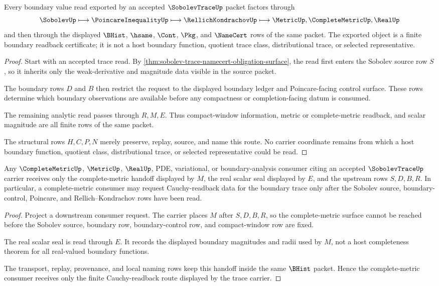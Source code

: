 \begin{theorem}
\label{thm:sobolev-trace-boundary-readback}
Every boundary value read exported by an accepted $\SobolevTraceUp$ packet factors through
$$
\SobolevUp \longmapsto \PoincareInequalityUp \longmapsto \RellichKondrachovUp \longmapsto \MetricUp,\CompleteMetricUp,\RealUp
$$
and then through the displayed $\BHist$, $\hsame$, $\Cont$, $\Pkg$, and $\NameCert$ rows of the same packet. The exported object is a finite boundary readback certificate; it is not a host boundary function, quotient trace class, distributional trace, or selected representative.
\end{theorem}
\begin{proof}
Start with an accepted trace read. By \autoref{thm:sobolev-trace-namecert-obligation-surface}, the read first enters the Sobolev source row $S$, so it inherits only the weak-derivative and magnitude data visible in the source packet.

The boundary rows $D$ and $B$ then restrict the request to the displayed boundary ledger and Poincare-facing control surface. These rows determine which boundary observations are available before any compactness or completion-facing datum is consumed.

The remaining analytic read passes through $R,M,E$. Thus compact-window information, metric or complete-metric readback, and scalar magnitude are all finite rows of the same packet.

The structural rows $H,C,P,N$ merely preserve, replay, source, and name this route. No carrier coordinate remains from which a host boundary function, quotient class, distributional trace, or selected representative could be read.
\end{proof}

\begin{theorem}
\label{thm:sobolev-trace-complete-metric-handoff}
Any $\CompleteMetricUp$, $\MetricUp$, $\RealUp$, PDE, variational, or boundary-analysis consumer citing an accepted $\SobolevTraceUp$ carrier receives only the complete-metric handoff displayed by $M$, the real scalar seal displayed by $E$, and the upstream rows $S,D,B,R$. In particular, a complete-metric consumer may request Cauchy-readback data for the boundary trace only after the Sobolev source, boundary-control, Poincare, and Rellich--Kondrachov rows have been read.
\end{theorem}
\begin{proof}
Project a downstream consumer request. The carrier places $M$ after $S,D,B,R$, so the complete-metric surface cannot be reached before the Sobolev source, boundary row, boundary-control row, and compact-window row are fixed.

The real scalar seal is read through $E$. It records the displayed boundary magnitudes and radii used by $M$, not a host completeness theorem for all real-valued boundary functions.

The transport, replay, provenance, and local naming rows keep this handoff inside the same $\BHist$ packet. Hence the complete-metric consumer receives only the finite Cauchy-readback route displayed by the trace carrier.
\end{proof}

